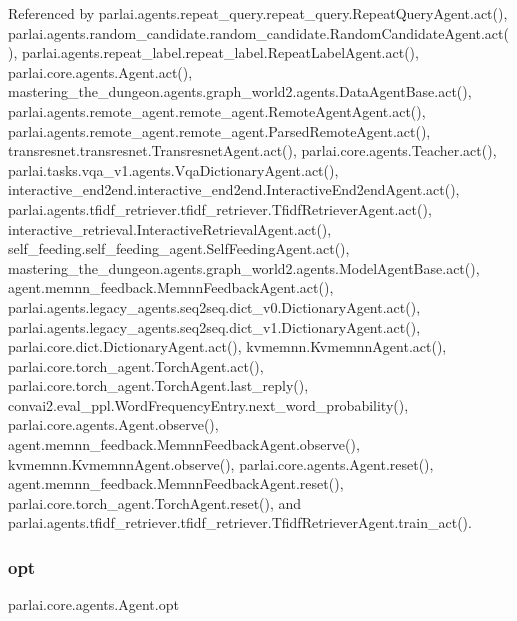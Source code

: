 Referenced by parlai.\+agents.\+repeat\+\_\+query.\+repeat\+\_\+query.\+Repeat\+Query\+Agent.\+act(), parlai.\+agents.\+random\+\_\+candidate.\+random\+\_\+candidate.\+Random\+Candidate\+Agent.\+act(), parlai.\+agents.\+repeat\+\_\+label.\+repeat\+\_\+label.\+Repeat\+Label\+Agent.\+act(), parlai.\+core.\+agents.\+Agent.\+act(), mastering\+\_\+the\+\_\+dungeon.\+agents.\+graph\+\_\+world2.\+agents.\+Data\+Agent\+Base.\+act(), parlai.\+agents.\+remote\+\_\+agent.\+remote\+\_\+agent.\+Remote\+Agent\+Agent.\+act(), parlai.\+agents.\+remote\+\_\+agent.\+remote\+\_\+agent.\+Parsed\+Remote\+Agent.\+act(), transresnet.\+transresnet.\+Transresnet\+Agent.\+act(), parlai.\+core.\+agents.\+Teacher.\+act(), parlai.\+tasks.\+vqa\+\_\+v1.\+agents.\+Vqa\+Dictionary\+Agent.\+act(), interactive\+\_\+end2end.\+interactive\+\_\+end2end.\+Interactive\+End2end\+Agent.\+act(), parlai.\+agents.\+tfidf\+\_\+retriever.\+tfidf\+\_\+retriever.\+Tfidf\+Retriever\+Agent.\+act(), interactive\+\_\+retrieval.\+Interactive\+Retrieval\+Agent.\+act(), self\+\_\+feeding.\+self\+\_\+feeding\+\_\+agent.\+Self\+Feeding\+Agent.\+act(), mastering\+\_\+the\+\_\+dungeon.\+agents.\+graph\+\_\+world2.\+agents.\+Model\+Agent\+Base.\+act(), agent.\+memnn\+\_\+feedback.\+Memnn\+Feedback\+Agent.\+act(), parlai.\+agents.\+legacy\+\_\+agents.\+seq2seq.\+dict\+\_\+v0.\+Dictionary\+Agent.\+act(), parlai.\+agents.\+legacy\+\_\+agents.\+seq2seq.\+dict\+\_\+v1.\+Dictionary\+Agent.\+act(), parlai.\+core.\+dict.\+Dictionary\+Agent.\+act(), kvmemnn.\+Kvmemnn\+Agent.\+act(), parlai.\+core.\+torch\+\_\+agent.\+Torch\+Agent.\+act(), parlai.\+core.\+torch\+\_\+agent.\+Torch\+Agent.\+last\+\_\+reply(), convai2.\+eval\+\_\+ppl.\+Word\+Frequency\+Entry.\+next\+\_\+word\+\_\+probability(), parlai.\+core.\+agents.\+Agent.\+observe(), agent.\+memnn\+\_\+feedback.\+Memnn\+Feedback\+Agent.\+observe(), kvmemnn.\+Kvmemnn\+Agent.\+observe(), parlai.\+core.\+agents.\+Agent.\+reset(), agent.\+memnn\+\_\+feedback.\+Memnn\+Feedback\+Agent.\+reset(), parlai.\+core.\+torch\+\_\+agent.\+Torch\+Agent.\+reset(), and parlai.\+agents.\+tfidf\+\_\+retriever.\+tfidf\+\_\+retriever.\+Tfidf\+Retriever\+Agent.\+train\+\_\+act().

\mbox{\label{classparlai_1_1core_1_1agents_1_1Agent_ab3b45d2754244608c75d4068b90cd051}} 
\subsubsection{\texorpdfstring{opt}{opt}}
{\footnotesize\ttfamily parlai.\+core.\+agents.\+Agent.\+opt}



